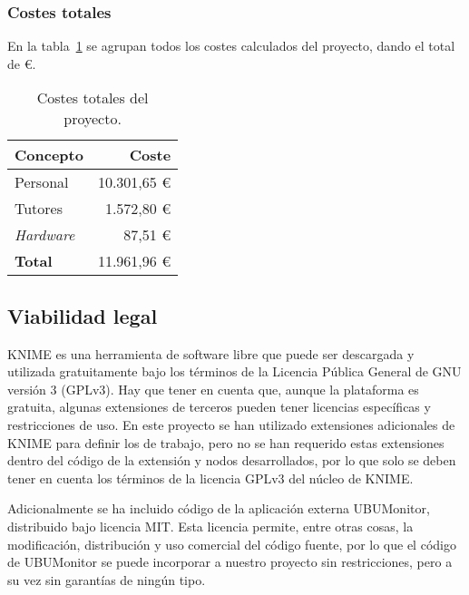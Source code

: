 \subsubsection{Costes totales}

En la tabla~\ref{tab:total} se agrupan todos los costes calculados del proyecto, dando el total de  €.

\begin{table}[!h]
	\centering
	\begin{tabular}{lr}
		\toprule
		\textbf{Concepto} & \textbf{Coste} \\
		\midrule
		Personal & 10.301,65 € \\
		Tutores  & 1.572,80 € \\
		\textit{Hardware} & 87,51 € \\
		\midrule
		\textbf{Total} & 11.961,96 € \\
		\bottomrule
	\end{tabular}
	\caption{Costes totales del proyecto.}
	\label{tab:total}
\end{table}

\subsection{Viabilidad legal}

KNIME es una herramienta de software libre que puede ser descargada y utilizada gratuitamente bajo los 
términos de la Licencia Pública General de GNU versión 3 (GPLv3). Hay que tener en cuenta que, aunque la 
plataforma es gratuita, algunas extensiones de terceros pueden tener licencias específicas y 
restricciones de uso. En este proyecto se han utilizado extensiones adicionales de KNIME para 
definir los  de trabajo, pero no se han requerido estas extensiones dentro del código 
de la extensión y nodos desarrollados, por lo que solo se deben tener en cuenta los términos de la
 licencia GPLv3 del núcleo de KNIME. 

Adicionalmente se ha incluido código de la aplicación externa UBUMonitor, distribuido bajo licencia MIT. Esta licencia permite, entre 
otras cosas, la modificación, distribución y uso comercial del código fuente, por lo que el código 
de UBUMonitor se puede incorporar a nuestro proyecto sin restricciones, pero a su vez sin garantías de ningún tipo. 

